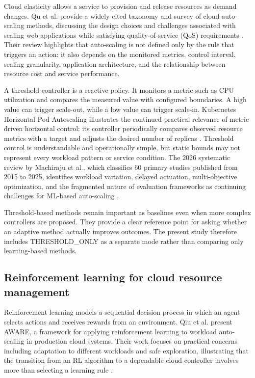 \documentclass[pdflatex,sn-mathphys-num]{sn-jnl}
\begin{document}
Cloud elasticity allows a service to provision and release resources as demand changes. Qu et al. provide a widely cited taxonomy and survey of cloud auto-scaling methods, discussing the design choices and challenges associated with scaling web applications while satisfying quality-of-service (QoS) requirements \cite{qu2018autoscaling}. Their review highlights that auto-scaling is not defined only by the rule that triggers an action: it also depends on the monitored metrics, control interval, scaling granularity, application architecture, and the relationship between resource cost and service performance.

A threshold controller is a reactive policy. It monitors a metric such as CPU utilization and compares the measured value with configured boundaries. A high value can trigger scale-out, while a low value can trigger scale-in. Kubernetes Horizontal Pod Autoscaling illustrates the continued practical relevance of metric-driven horizontal control: its controller periodically compares observed resource metrics with a target and adjusts the desired number of replicas \cite{kubernetesHPA}. Threshold control is understandable and operationally simple, but static bounds may not represent every workload pattern or service condition. The 2026 systematic review by Machiraju et al., which classifies 60 primary studies published from 2015 to 2025, identifies workload variation, delayed actuation, multi-objective optimization, and the fragmented nature of evaluation frameworks as continuing challenges for ML-based auto-scaling \cite{machiraju2026survey}.

Threshold-based methods remain important as baselines even when more complex controllers are proposed. They provide a clear reference point for asking whether an adaptive method actually improves outcomes. The present study therefore includes THRESHOLD\_ONLY as a separate mode rather than comparing only learning-based methods.

\subsection{Reinforcement learning for cloud resource management}

Reinforcement learning models a sequential decision process in which an agent selects actions and receives rewards from an environment. Qiu et al. present AWARE, a framework for applying reinforcement learning to workload auto-scaling in production cloud systems. Their work focuses on practical concerns including adaptation to different workloads and safe exploration, illustrating that the transition from an RL algorithm to a dependable cloud controller involves more than selecting a learning rule \cite{qiu2023aware}.
\end{document}
